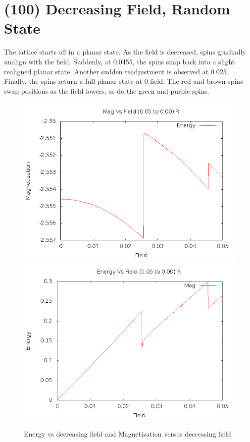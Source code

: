 \documentclass{article}
\begin{document}
\section{(100) Decreasing Field, Random State}
The lattice starts off in a planar state. As the field is decreased, spins gradually unalign with the field. 
Suddenly, at 0.0455, the spins snap back into a slight realigned planar state. Another sudden readjustment
is observed at 0.025. Finally, the spins return a full planar state at 0 field. The red and brown spins
swap positions as the field lowers, as do the green and purple spins. 
\begin{figure}[h]
 \centering 
\includegraphics[scale=0.3]{100/E005to000R.png}
\includegraphics[scale=0.3]{100/M005to000R.png}
\caption{Energy vs decreasing field and Magnetization versus decreasing field}
\end{figure}
\end{document}
